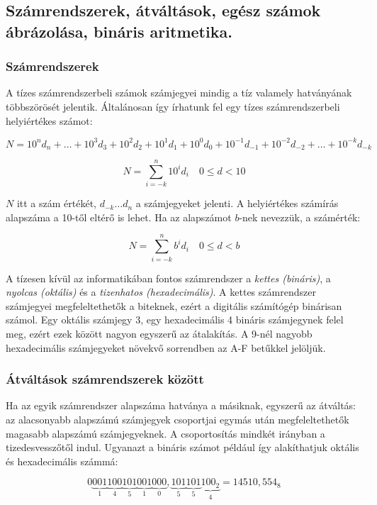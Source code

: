 \documentclass[10pt]{article}
\begin{document}
\subsection{Számrendszerek, átváltások, egész számok ábrázolása, bináris aritmetika.}

\subsubsection{Számrendszerek}

A tízes számrendszerbeli számok számjegyei mindig a tíz valamely hatványának többszörösét jelentik. Általánosan így írhatunk fel egy tízes számrendszerbeli helyiértékes számot:

$$N = 10^{n} d_n + \dots + 10^3 d_3 + 10^2 d_2 + 10^1 d_1 + 10^0 d_0 + 10^{-1} d_{-1} + 10^{-2} d_{-2} + \dots + 10^{-k} d_{-k}$$

$$N = \sum_{i=-k}^{n} 10^i d_i\quad0 \leq d < 10$$

$N$ itt a szám értékét, $d_{-k} \dots d_n$ a számjegyeket jelenti. A helyiértékes számírás alapszáma a 10-től eltérő is lehet. Ha az alapszámot $b$-nek nevezzük, a számérték:

$$N = \sum_{i=-k}^{n} b^i d_i\quad0 \leq d < b$$

A tízesen kívül az informatikában fontos számrendszer a \emph{kettes (bináris)}, a \emph{nyolcas (oktális)} és a \emph{tizenhatos (hexadecimális)}. A kettes számrendszer számjegyei megfeleltethetők a biteknek, ezért a digitális számítógép binárisan számol. Egy oktális számjegy 3, egy hexadecimális 4 bináris számjegynek felel meg, ezért ezek között nagyon egyszerű az átalakítás. A 9-nél nagyobb hexadecimális számjegyeket növekvő sorrendben az A-F betűkkel jelöljük.

\subsubsection{Átváltások számrendszerek között}

Ha az egyik számrendszer alapszáma hatványa a másiknak, egyszerű az átváltás: az alacsonyabb alapszámú számjegyek csoportjai egymás után megfeleltethetők magasabb alapszámú számjegyeknek. A csoportosítás mindkét irányban a tizedesvesszőtől indul. Ugyanazt a bináris számot például így alakíthatjuk oktális és hexadecimális számmá:

$$0\underbrace{0 0 1}_1 \underbrace{1 0 0}_4 \underbrace{1 0 1}_5 \underbrace{0 0 1}_1 \underbrace{0 0 0}_0 , \underbrace{1 0 1}_5 \underbrace{1 0 1}_5 \underbrace{1 0 0_2}_4 = 14510,554_8$$
\end{document}
